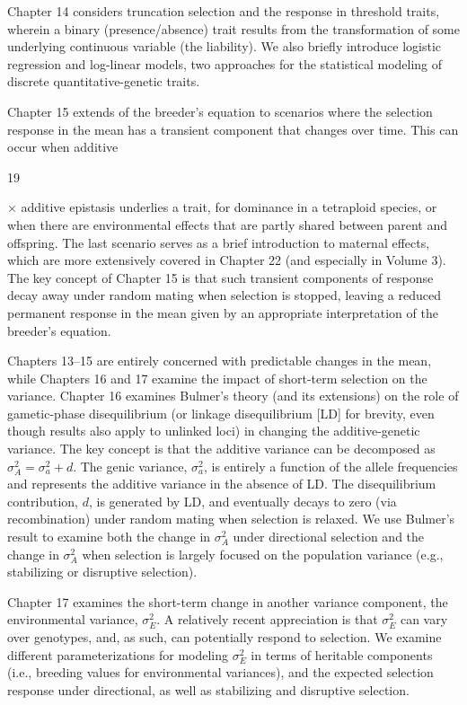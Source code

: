 \documentclass{article}
\begin{document}
Chapter 14 considers truncation selection and the response in threshold traits, wherein a binary (presence/absence) trait results from the transformation of some underlying continuous variable (the liability). We also briefly introduce logistic regression and log-linear models, two approaches for the statistical modeling of discrete quantitative-genetic traits.

Chapter 15 extends of the breeder’s equation to scenarios where the selection response in the mean has a transient component that changes over time. This can occur when additive

19

× additive epistasis underlies a trait, for dominance in a tetraploid species, or when there are environmental effects that are partly shared between parent and offspring. The last scenario serves as a brief introduction to maternal effects, which are more extensively covered in Chapter 22 (and especially in Volume 3). The key concept of Chapter 15 is that such transient components of response decay away under random mating when selection is stopped, leaving a reduced permanent response in the mean given by an appropriate interpretation of the breeder's equation.

Chapters 13–15 are entirely concerned with predictable changes in the mean, while Chapters 16 and 17 examine the impact of short-term selection on the variance. Chapter 16 examines Bulmer's theory (and its extensions) on the role of gametic-phase disequilibrium (or linkage disequilibrium [LD] for brevity, even though results also apply to unlinked loci) in changing the additive-genetic variance. The key concept is that the additive variance can be decomposed as  $ \sigma_{A}^{2} = \sigma_{a}^{2} + d $. The genic variance,  $ \sigma_{a}^{2} $, is entirely a function of the allele frequencies and represents the additive variance in the absence of LD. The disequilibrium contribution,  $ d $, is generated by LD, and eventually decays to zero (via recombination) under random mating when selection is relaxed. We use Bulmer's result to examine both the change in  $ \sigma_{A}^{2} $ under directional selection and the change in  $ \sigma_{A}^{2} $ when selection is largely focused on the population variance (e.g., stabilizing or disruptive selection).

Chapter 17 examines the short-term change in another variance component, the environmental variance,  $ \sigma_E^2 $. A relatively recent appreciation is that  $ \sigma_E^2 $ can vary over genotypes, and, as such, can potentially respond to selection. We examine different parameterizations for modeling  $ \sigma_E^2 $ in terms of heritable components (i.e., breeding values for environmental variances), and the expected selection response under directional, as well as stabilizing and disruptive selection.
\end{document}
